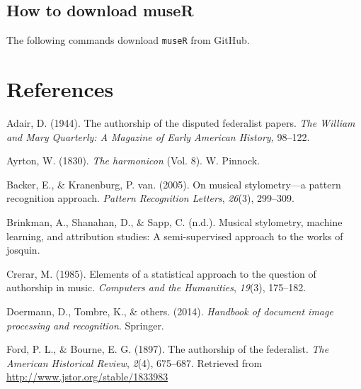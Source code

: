\documentclass[12pt,twoside]{reedthesis}
\theoremstyle{definition}
\theoremstyle{definition}
\theoremstyle{definition}
\theoremstyle{remark}
\begin{document}
\section*{How to download museR}\label{how-to-download-muser}

The following commands download \texttt{museR} from GitHub.
\begin{Shaded}
\begin{Highlighting}[]
\NormalTok{(}\NormalTok{)}
\end{Highlighting}
\end{Shaded}
\backmatter

\chapter*{References}\label{references}


\noindent

\setlength{\parindent}{-0.20in} \setlength{\leftskip}{0.20in}
\setlength{\parskip}{8pt}

\hypertarget{refs}{}
\hypertarget{ref-adair1944}{}
Adair, D. (1944). The authorship of the disputed federalist papers.
\emph{The William and Mary Quarterly: A Magazine of Early American
History,} 98--122.

\hypertarget{ref-harmonicon}{}
Ayrton, W. (1830). \emph{The harmonicon} (Vol. 8). W. Pinnock.

\hypertarget{ref-backer2005}{}
Backer, E., \& Kranenburg, P. van. (2005). On musical stylometry---a
pattern recognition approach. \emph{Pattern Recognition Letters},
\emph{26}(3), 299--309.

\hypertarget{ref-brinkman2016}{}
Brinkman, A., Shanahan, D., \& Sapp, C. (n.d.). Musical stylometry,
machine learning, and attribution studies: A semi-supervised approach to
the works of josquin.

\hypertarget{ref-crerar}{}
Crerar, M. (1985). Elements of a statistical approach to the question of
authorship in music. \emph{Computers and the Humanities}, \emph{19}(3),
175--182.

\hypertarget{ref-OMR}{}
Doermann, D., Tombre, K., \& others. (2014). \emph{Handbook of document
image processing and recognition}. Springer.

\hypertarget{ref-authorshipfed}{}
Ford, P. L., \& Bourne, E. G. (1897). The authorship of the federalist.
\emph{The American Historical Review}, \emph{2}(4), 675--687. Retrieved
from \url{http://www.jstor.org/stable/1833983}
\end{document}
